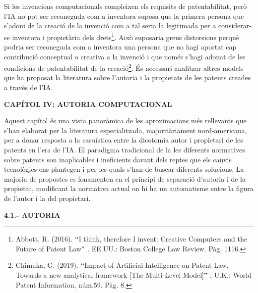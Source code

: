 \documentclass[12pt]{article}
\begin{document}
\begin{justify}
Si les invencions computacionals compleixen els requisits de patentabilitat, però l’IA no pot ser reconeguda com a inventora suposa que la primera persona que s’adoni de la creació de la invenció com a tal seria la legitimada per a considerar-se inventora i propietària dels drets\footnote{ Abbott, R. (2016). $``$I think, therefore I invent: Creative Computers and the Future of Patent Law$"$ . EE.UU.: Boston College Law Review. Pàg. 1116. }. Això suposaria greus distorsions perquè podria ser reconeguda com a inventora una persona que no hagi aportat cap contribució conceptual o creativa a la invenció i que només s’hagi adonat de les condicions de patentabilitat de la creació\footnote{ Chimuka, G. (2019). $``$Impact of Artificial Intelligence on Patent Law. Towards a new analytical framework [The Multi-Level Model]$"$ , U.K.: World Patent Information, núm.59. Pàg. 8. }. És necessari analitzar altres models que ha proposat la literatura sobre l’autoria i la propietats de les patents creades a través de l’IA. 
\end{justify}\par

\begin{Center}
{\fontsize{16pt}{19.2pt}\selectfont \textbf{CAPÍTOL IV: AUTORIA COMPUTACIONAL}\par}
\end{Center}\par


\vspace{\baselineskip}
\begin{justify}
Aquest capítol és una vista panoràmica de les aproximacions més rellevants que s’han elaborat per la literatura especialitzada, majoritàriament nord-americana, per a donar resposta a la casuística entre la dicotomia autor i propietari de les patents en l’era de l’IA. El paradigma tradicional de la les diferents normatives sobre patents son inaplicables i ineficients davant dels reptes que els canvis tecnològics ens plantegen i per les quals s’han de buscar diferents solucions. La majoria de propostes es fonamenten en el principi de separació d’autoria i de la propietat, modificant la normativa actual on hi ha un automatisme entre la figura de l’autor i la del propietari. 
\end{justify}\par


\vspace{\baselineskip}
\begin{justify}
\textbf{4.1.- AUTORIA}
\end{justify}\par
\end{document}
